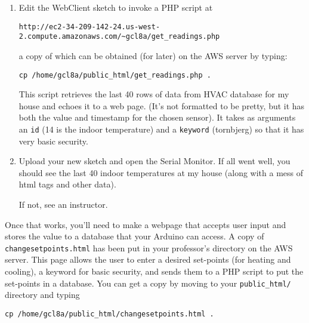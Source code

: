 \documentclass[11pt]{article} %
\begin{document}
\begin{enumerate}
\item Edit the WebClient sketch to invoke a PHP script at

\begin{verbatim}
http://ec2-34-209-142-24.us-west-2.compute.amazonaws.com/~gcl8a/get_readings.php
\end{verbatim}

a copy of which can be obtained (for later) on the AWS server by typing:

\verb|cp /home/gcl8a/public_html/get_readings.php .|

This script retrieves the last 40 rows of data from HVAC database for my house and echoes it to a web page. (It's not formatted to be pretty, but it has both the value and timestamp for the chosen sensor). It takes as arguments an \verb|id| (14 is the indoor temperature) and a \verb|keyword| (tornbjerg) so that it has very basic security.
\item Upload your new sketch and open the Serial Monitor. If all went well, you should see the last 40 indoor temperatures at my house (along with a mess of html tags and other data).

If not, see an instructor.
\end{enumerate}

Once that works, you'll need to make a webpage that accepts user input and stores the value to a database that your Arduino can access. A copy of \verb|changesetpoints.html| has been put in your professor's directory on the AWS server. This page allows the user to enter a desired set-points (for heating and cooling), a keyword for basic security, and sends them to a PHP script to put the set-points in a database. You can get a copy by moving to your \verb|public_html/| directory and typing 

\verb|cp /home/gcl8a/public_html/changesetpoints.html .| 
\end{document}
